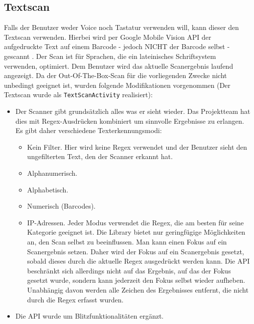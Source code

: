 \hypertarget{textscan}{%
\subsection{Textscan}\label{textscan}}

Falls der Benutzer weder Voice noch Tastatur verwenden will, kann dieser
den Textscan verwenden. Hierbei wird per Google Mobile Vision API der
aufgedruckte Text auf einem Barcode - jedoch NICHT der Barcode selbst -
gescannt \cite{text-scan}. Der Scan ist für Sprachen, die ein
lateinisches Schriftsystem verwenden, optimiert. Dem Benutzer wird das
aktuelle Scanergebnis laufend angezeigt. Da der Out-Of-The-Box-Scan für
die vorliegenden Zwecke nicht unbedingt geeignet ist, wurden folgende
Modifikationen vorgenommen (Der Textscan wurde als
\texttt{TextScanActivity} realisiert):

\begin{itemize}
\tightlist
\item
  Der Scanner gibt grundsätzlich alles was er sieht wieder. Das
  Projektteam hat dies mit Regex-Ausdrücken kombiniert um sinnvolle
  Ergebnisse zu erlangen. Es gibt daher verschiedene Texterkennungsmodi:

  \begin{itemize}
  \tightlist
  \item
    Kein Filter. Hier wird keine Regex verwendet und der Benutzer sieht
    den ungefilterten Text, den der Scanner erkannt hat.
  \item
    Alphanumerisch.
  \item
    Alphabetisch.
  \item
    Numerisch (Barcodes).
  \item
    IP-Adressen. Jeder Modus verwendet die Regex, die am besten für
    seine Kategorie geeignet ist. Die Library bietet nur geringfügige
    Möglichkeiten an, den Scan selbst zu beeinflussen. Man kann einen
    Fokus auf ein Scanergebnis setzen. Daher wird der Fokus auf ein
    Scanergebnis gesetzt, sobald dieses durch die aktuelle Regex
    ausgedrückt werden kann. Die API beschränkt sich allerdings nicht
    auf das Ergebnis, auf das der Fokus gesetzt wurde, sondern kann
    jederzeit den Fokus selbst wieder aufheben. Unabhängig davon werden
    alle Zeichen des Ergebnisses entfernt, die nicht durch die Regex
    erfasst wurden.
  \end{itemize}
\item
  Die API wurde um Blitzfunktionalitäten ergänzt.
\end{itemize}

